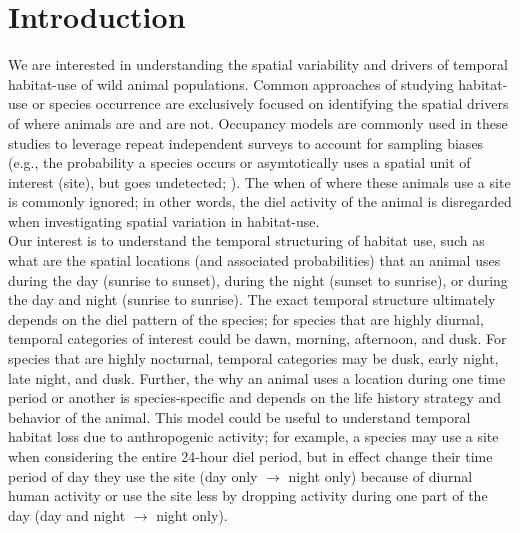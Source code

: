 \documentclass[12pt]{article}
\begin{document}
\setlength{\abovedisplayskip}{-2pt}
\setlength{\belowdisplayskip}{10pt}
\setlength{\abovedisplayshortskip}{0pt}
\setlength{\belowdisplayshortskip}{10pt}
\maketitle


\section{Introduction}
We are interested in understanding the spatial variability and drivers of temporal habitat-use of wild animal populations. Common approaches of studying habitat-use or species occurrence are exclusively focused on identifying the spatial drivers of where animals are and are not. Occupancy models are commonly used in these studies to leverage repeat independent surveys to account for sampling biases (e.g., the probability a species occurs or asymtotically uses a spatial unit of interest (site), but goes undetected; \citealt{occupancybook}). The when of where these animals use a site is commonly ignored; in other words, the diel activity of the animal is disregarded when investigating spatial variation in habitat-use. \\

Our interest is to understand the temporal structuring of habitat use, such as what are the spatial locations (and associated probabilities) that an animal uses during the day (sunrise to sunset), during the night (sunset to sunrise), or during the day and night (sunrise to sunrise). The exact temporal structure ultimately depends on the diel pattern of the species; for species that are highly diurnal, temporal categories of interest could be dawn, morning, afternoon, and dusk. For species that are highly nocturnal, temporal categories may be dusk, early night, late night, and dusk. Further, the why an animal uses a location during one time period or another is species-specific and depends on the life history strategy and behavior of the animal. This model could be useful to understand temporal habitat loss due to anthropogenic activity; for example, a species may use a site when considering the entire 24-hour diel period, but in effect change their time period of day they use the site (day only $\rightarrow$ night only) because of diurnal human activity or use the site less by dropping activity during one part of the day (day and night $\rightarrow$ night only). \\
\end{document}
